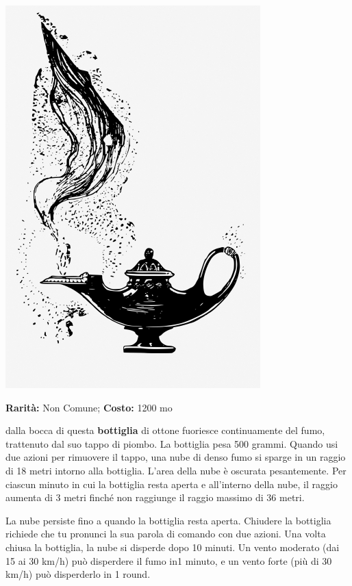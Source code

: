 \begin{multicols}{2}
\begin{center}
	\includegraphics[width=0.7\linewidth]{immagini/genielamp.png}
\end{center}


\textbf{Rarità:} Non Comune; \textbf{Costo:} 1200 mo

dalla bocca di questa \textbf{bottiglia} di ottone fuoriesce continuamente del fumo, trattenuto dal suo tappo di piombo. La bottiglia pesa 500 grammi. Quando usi due azioni per rimuovere il tappo, una nube di denso fumo si sparge in un raggio di 18 metri intorno alla bottiglia. L'area della nube è oscurata pesantemente. Per ciascun minuto in cui la bottiglia resta aperta e all'interno della nube, il raggio aumenta di 3 metri finché non raggiunge il raggio massimo di 36 metri.

La nube persiste fino a quando la bottiglia resta aperta. Chiudere la bottiglia richiede che tu pronunci la sua parola di comando con due azioni. Una volta chiusa la bottiglia, la nube si disperde dopo 10 minuti. Un vento moderato (dai 15 ai 30 km/h) può disperdere il fumo in1 minuto, e un vento forte (più di 30 km/h) può disperderlo in 1 round.



\end{multicols}
